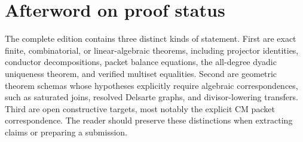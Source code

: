 \documentclass[11pt,oneside]{book}
\theoremstyle{definition}
\theoremstyle{remark}
\begin{document}
\chapter*{Afterword on proof status}
The complete edition contains three distinct kinds of statement. First are exact finite, combinatorial, or linear-algebraic theorems, including projector identities, conductor decompositions, packet balance equations, the all-degree dyadic uniqueness theorem, and verified multiset equalities. Second are geometric theorem schemas whose hypotheses explicitly require algebraic correspondences, such as saturated joins, resolved Delsarte graphs, and divisor-lowering transfers. Third are open constructive targets, most notably the explicit CM packet correspondence. The reader should preserve these distinctions when extracting claims or preparing a submission.
\end{document}
